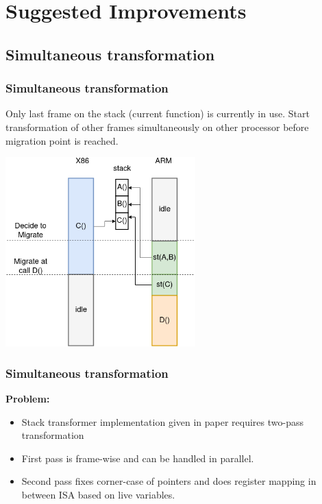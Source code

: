 \documentclass[10pt]{beamer}
\begin{document}

\section{Suggested Improvements}

\subsection{Simultaneous transformation}

\begin{frame}
\frametitle{Simultaneous transformation}
Only last frame on the stack (current function) is currently in use.
Start transformation of other frames simultaneously on other processor before migration point is reached.

\includegraphics[width=0.55\textwidth]{simul_trans}
\end{frame}

\begin{frame}
\frametitle{Simultaneous transformation}

\textbf{Problem:}
\begin{itemize}
\item Stack transformer implementation given in paper requires two-pass transformation
\item First pass is frame-wise and can be handled in parallel.
\item Second pass fixes corner-case of pointers and does register mapping in between ISA based on live variables.
\end{itemize}
\end{frame}


\end{document}
